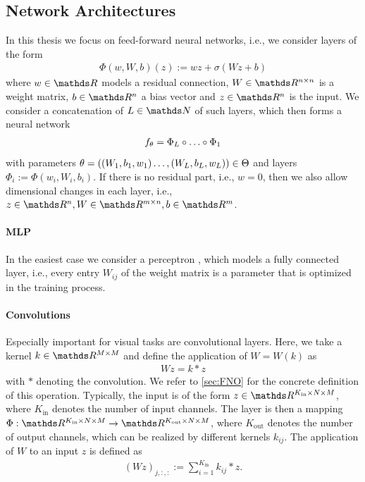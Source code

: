 \subsection{Network Architectures}
%
%
In this thesis we focus on feed-forward neural networks, i.e., we consider layers of the form
%
\begin{align}\label{eq:layer}
\Phi(w, W, b)(z):= wz + \sigma(Wz + b)
\end{align}
%
where $w\in\R$ models a residual connection, $W\in\R^{n\times n}$ is a weight matrix, $b\in\R^n$ a bias vector and $z\in\R^{n}$ is the input. We consider a concatenation of $L\in\N$ of such layers, which then forms a neural network
%
\begin{align*}
f_\theta = \Phi_L\circ\ldots\circ\Phi_1
\end{align*} 
%
with parameters $\theta =((W_1,b_1,w_1)\ldots,(W_L,b_L,w_L))\in\Theta$ and layers $\Phi_i := \Phi(w_i, W_i, b_i)$. If there is no residual part, i.e., $w=0$, then we also allow dimensional changes in each layer, i.e., $z\in\R^n, W\in\R^{m\times n}, b\in\R^m$. 
%
\paragraph{MLP} In the easiest case we consider a perceptron \cite{rosenblatt1958perceptron}, which models a fully connected layer, i.e., every entry $W_{ij}$ of the weight matrix is a parameter that is optimized in the training process.

\paragraph{Convolutions}\label{sec:convlayer} Especially important for visual tasks are convolutional layers. Here, we take a kernel $k\in \R^{M\times M}$ and define the application of $W=W(k)$ as
%
\begin{align*}
Wz = k\ast z
\end{align*}
%
with $\ast$ denoting the convolution. We refer to \cref{sec:FNO} for the concrete definition of this operation. Typically, the input is of the form $z\in\R^{K_{\text{in}}\times N \times M}$, where $K_{\text{in}}$ denotes the number of input channels. The layer is then a mapping $\Phi:\R^{K_{\text{in}}\times N \times M}\to\R^{K_{\text{out}}\times N \times M}$, where $K_{\text{out}}$ denotes the number of output channels, which can be realized by different kernels $k_{ij}$. The application of $W$ to an input $z$ is defined as
%
\begin{align*}
(Wz)_{j,:,:} := \sum_{i=1}^{K_{\text{in}}} k_{ij}\ast z.
\end{align*}

